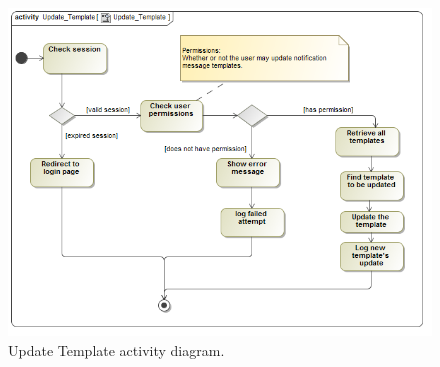 \documentclass [a4paper,12pt] {article}
\begin{document}
			\begin{figure}[H]
				\centering
				\includegraphics[width=1.0\textwidth]{UpdateTemplateAD.png}
				\caption{Update Template activity diagram.}
			\end{figure}
\end{document}
